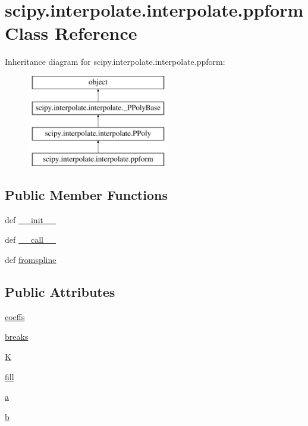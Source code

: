 \hypertarget{classscipy_1_1interpolate_1_1interpolate_1_1ppform}{}\section{scipy.\+interpolate.\+interpolate.\+ppform Class Reference}
\label{classscipy_1_1interpolate_1_1interpolate_1_1ppform}
Inheritance diagram for scipy.\+interpolate.\+interpolate.\+ppform\+:\begin{figure}[H]
\begin{center}
\leavevmode
\includegraphics[height=4.000000cm]{classscipy_1_1interpolate_1_1interpolate_1_1ppform}
\end{center}
\end{figure}
\subsection*{Public Member Functions}
\begin{DoxyCompactItemize}
\item 
def \hyperlink{classscipy_1_1interpolate_1_1interpolate_1_1ppform_a0b2cdd26fb26f9d276a60ea14986740d}{\+\_\+\+\_\+init\+\_\+\+\_\+}
\item 
def \hyperlink{classscipy_1_1interpolate_1_1interpolate_1_1ppform_a07daa5f4d8cc1333950d50c525a287dc}{\+\_\+\+\_\+call\+\_\+\+\_\+}
\item 
def \hyperlink{classscipy_1_1interpolate_1_1interpolate_1_1ppform_aaeb4a5ff0a9ff4d0821683c37e7ad7a7}{fromspline}
\end{DoxyCompactItemize}
\subsection*{Public Attributes}
\begin{DoxyCompactItemize}
\item 
\hyperlink{classscipy_1_1interpolate_1_1interpolate_1_1ppform_a08c127eaf5065cbdfc9039f6ded1d7ab}{coeffs}
\item 
\hyperlink{classscipy_1_1interpolate_1_1interpolate_1_1ppform_a74423ec2b6ad294043a60809edfacbb3}{breaks}
\item 
\hyperlink{classscipy_1_1interpolate_1_1interpolate_1_1ppform_a38ef1c9b4a8b79c3ecfcb1f1655ca1a4}{K}
\item 
\hyperlink{classscipy_1_1interpolate_1_1interpolate_1_1ppform_a078d6b4ba1a1394838d226195b24f819}{fill}
\item 
\hyperlink{classscipy_1_1interpolate_1_1interpolate_1_1ppform_a04f88f0e86bd8eec2b299795beebcccb}{a}
\item 
\hyperlink{classscipy_1_1interpolate_1_1interpolate_1_1ppform_ad72186dfe81364c8347be196b8a11f2b}{b}
\end{DoxyCompactItemize}



